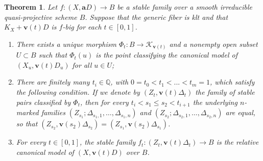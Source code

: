 \documentclass[11pt]{amsart}
\newcommand{\margg}[1]{\normalsize{{\color{red}\footnote{{\color{red}#1}}}{\marginpar[{\color{red}\hfill\tiny\thefootnote$\rightarrow$}]{{\color{red}$\leftarrow$\tiny\thefootnote}}}}}
\newcommand{\Dori}[1]{\margg{(Dori) #1}}
\newtheorem{theorem}{Theorem}[section]
\theoremstyle{definition}
\theoremstyle{remark}
\newcommand{\calU}{\mathcal U}
\newcommand{\sK}{\mathscr{K}}
\newcommand{\bfv}{\mathbf{v}}
\begin{document}
	\begin{theorem}\label{thm:morphismextends}
		Let $f: (X, \mathbf{a}D) \to B$ be a stable family over a smooth irreducible quasi-projective scheme $B$. Suppose that the generic fiber is klt and that $K_X + \mathbf{v}(t)D$ is $f$-big for each $t \in [0,1]$.%
		
		
		\begin{enumerate}\setlength\itemsep{.5em}
			\item  There exists a unique morphism $\Phi_t:B \to \sK_{\bfv(t)}$ and a nonempty open subset $U \subset B$ such that $\Phi_t(u)$ is the point classifying the canonical model of $(X_u,\mathbf{v}(t)D_u)$ for all $u \in U$;
			
			\item There are finitely many $t_i \in \mathbb{Q}$, with $0=t_0 <t_1<...<t_m=1$, which satisfy the following condition. If we denote by $(Z_{t},\mathbf{v}(t)\Delta_{t})$ the family of stable pairs classified by $\Phi_t$, then for every
			$t_i < s_1 \le s_2 <t_{i+1}$ the underlying $n$-marked families $(Z_{s_1}; \Delta_{s_1,1}, \ldots, \Delta_{s_1, n})$ and $(Z_{s_2}; \Delta_{s_2,1}, \ldots, \Delta_{s_2, n})$ are equal, so that $(Z_{s_2},\mathbf{v}(s_2)\Delta_{s_2})=(Z_{s_1},\mathbf{v}(s_2)\Delta_{s_1})$.
			\item For every $t \in [0,1]$, the stable family $f_t : (Z_t,\mathbf{v}(t)\Delta_t) \to B$ is the relative canonical model of $(X,\mathbf{v}(t)D)$ over $B$.
		\end{enumerate}
	\end{theorem}
	
\end{document}
